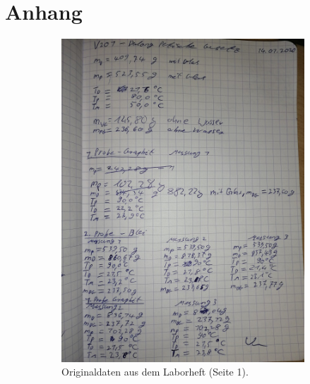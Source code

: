 \section{Anhang}
\begin{figure}
    \centering
    \begin{subfigure}{0.48\textwidth}
        \centering
        \includegraphics[width=\textwidth]{content/data/daten1.jpg}
        \caption{Originaldaten aus dem Laborheft (Seite 1).}
    \end{subfigure}
    \begin{subfigure}{0.48\textwidth}
        \centering

\end{subfigure}
\end{figure}
